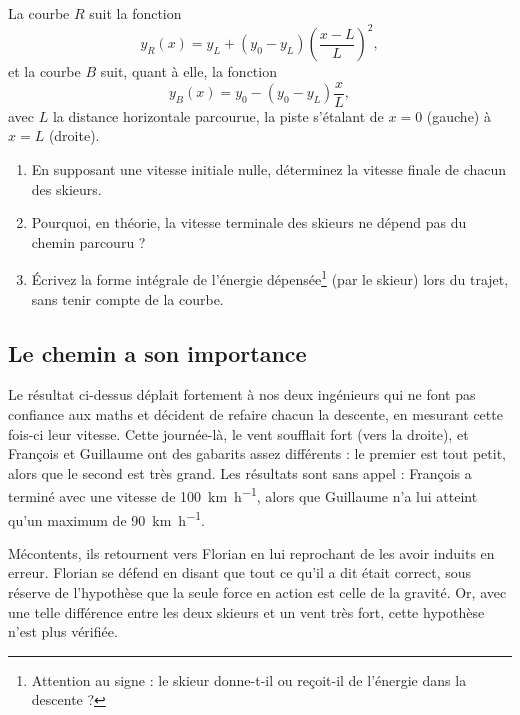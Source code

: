 \documentclass{cup-pan}
\begin{document}
La courbe $R$ suit la fonction
\begin{equation}
    y_R(x) = y_L + (y_0 - y_L)\left(\frac{x-L}{L}\right)^2,
\end{equation}
et la courbe $B$ suit, quant à elle, la fonction
\begin{equation}
    y_B(x) = y_0 - (y_0 - y_L)\frac{x}{L},
\end{equation}
avec $L$ la distance horizontale parcourue, la piste s'étalant de $x=0$ (gauche) à $x=L$ (droite).



\questions
\begin{enumerate}
    \item En supposant une vitesse initiale nulle, déterminez la vitesse finale de chacun des skieurs.
    \item Pourquoi, en théorie, la vitesse terminale des skieurs ne dépend pas du chemin parcouru ? \item Écrivez la forme intégrale de l'énergie dépensée\footnote{Attention au signe : le skieur donne-t-il ou reçoit-il de l'énergie dans la descente ?} (par le skieur) lors du trajet, sans tenir compte de la courbe.
\end{enumerate}





\subsection{Le chemin a son importance}

Le résultat ci-dessus déplait fortement à nos deux ingénieurs qui ne font pas confiance aux maths et décident de refaire chacun la descente, en mesurant cette fois-ci leur vitesse. Cette journée-là, le vent soufflait fort (vers la droite), et François et Guillaume ont des gabarits assez différents : le premier est tout petit, alors que le second est très grand. Les résultats sont sans appel : François a terminé avec une vitesse de \SI{100}{\kilo\meter\per\hour}, alors que Guillaume n'a lui atteint qu'un maximum de \SI{90}{\kilo\meter\per\hour}.

Mécontents, ils retournent vers Florian en lui reprochant de les avoir induits en erreur. Florian se défend en disant que tout ce qu'il a dit était correct, sous réserve de l'hypothèse que la seule force en action est celle de la gravité. Or, avec une telle différence entre les deux skieurs et un vent très fort, cette hypothèse n'est plus vérifiée.
\end{document}
